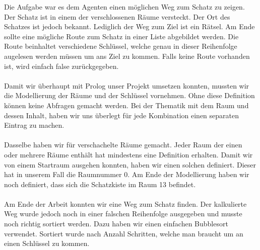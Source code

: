 Die Aufgabe war es dem Agenten einen möglichen Weg zum Schatz zu zeigen. 
Der Schatz ist in einem der verschlossenen Räume versteckt. Der Ort des
Schatzes ist jedoch bekannt. Lediglich der Weg zum Ziel ist ein Rätsel.
Am Ende sollte eine mögliche Route zum Schatz in einer Liste abgebildet
werden. Die Route beinhaltet verschiedene Schlüssel, welche genau in dieser
Reihenfolge augelesen werden müssen um ans Ziel zu kommen. Falls keine Route 
vorhanden ist, wird einfach false zurückgegeben.\\
\\
Damit wir überhaupt mit Prolog unser Projekt umsetzen konnten, mussten wir die 
Modellierung der Räume und der Schlüssel vornehmen. Ohne diese Definition können 
keine Abfragen gemacht werden. Bei der Thematik mit dem Raum und dessen Inhalt,
haben wir uns überlegt für jede Kombination einen separaten Eintrag zu machen. \\
\\
Dasselbe haben wir für verschachelte Räume gemacht. Jeder Raum der einen oder mehrere
Räume enthält hat mindestens eine Definition erhalten. Damit wir von einem Startraum
ausgehen konnten, haben wir einen solchen definiert. Dieser hat in unserem Fall 
die Raumnummer 0. Am Ende der Modellierung haben wir noch definiert, dass sich die 
Schatzkiste im Raum 13 befindet. \\
\\
Am Ende der Arbeit konnten wir eine Weg zum Schatz finden. Der kalkulierte Weg wurde
jedoch noch in einer falschen Reihenfolge ausgegeben und musste noch richtig sortiert
werden. Dazu haben wir einen einfachen Bubblesort verwendet. Sortiert wurde nach Anzahl Schritten,
welche man braucht um an einen Schlüssel zu kommen.